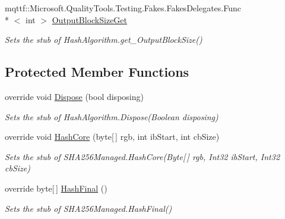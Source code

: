 \begin{DoxyCompactItemize}
mqttf\-::\-Microsoft.\-Quality\-Tools.\-Testing.\-Fakes.\-Fakes\-Delegates.\-Func\\*
$<$ int $>$ \hyperlink{class_system_1_1_security_1_1_cryptography_1_1_fakes_1_1_stub_s_h_a256_managed_af8bf0ccac09d00a33a3637ead9e22102}{Output\-Block\-Size\-Get}
\begin{DoxyCompactList}\small\item\em Sets the stub of Hash\-Algorithm.\-get\-\_\-\-Output\-Block\-Size()\end{DoxyCompactList}\end{DoxyCompactItemize}
\subsection*{Protected Member Functions}
\begin{DoxyCompactItemize}
\item 
override void \hyperlink{class_system_1_1_security_1_1_cryptography_1_1_fakes_1_1_stub_s_h_a256_managed_a51495df09d2f5ba53000ecc634687da8}{Dispose} (bool disposing)
\begin{DoxyCompactList}\small\item\em Sets the stub of Hash\-Algorithm.\-Dispose(\-Boolean disposing)\end{DoxyCompactList}\item 
override void \hyperlink{class_system_1_1_security_1_1_cryptography_1_1_fakes_1_1_stub_s_h_a256_managed_a853297a6db44b25ae3e2bf43a9b01e4f}{Hash\-Core} (byte\mbox{[}$\,$\mbox{]} rgb, int ib\-Start, int cb\-Size)
\begin{DoxyCompactList}\small\item\em Sets the stub of S\-H\-A256\-Managed.\-Hash\-Core(\-Byte\mbox{[}$\,$\mbox{]} rgb, Int32 ib\-Start, Int32 cb\-Size)\end{DoxyCompactList}\item 
override byte\mbox{[}$\,$\mbox{]} \hyperlink{class_system_1_1_security_1_1_cryptography_1_1_fakes_1_1_stub_s_h_a256_managed_aa8aa61c6f8cc6d236bc3f3bdd76dc335}{Hash\-Final} ()
\begin{DoxyCompactList}\small\item\em Sets the stub of S\-H\-A256\-Managed.\-Hash\-Final()\end{DoxyCompactList}\end{DoxyCompactItemize}
